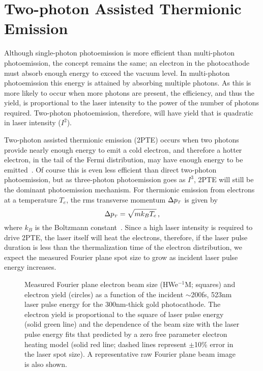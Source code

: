 
\section{Two-photon Assisted Thermionic Emission} \label{sec:two_photon_thermionic}

Although single-photon photoemission is more efficient than multi-photon photoemission, the concept remains the same; an electron in the photocathode must absorb enough energy to exceed the vacuum level.
In multi-photon photoemission this energy is attained by absorbing multiple photons.
As this is more likely to occur when more photons are present, the efficiency, and thus the yield, is proportional to the laser intensity to the power of the number of photons required.
Two-photon photoemission, therefore, will have yield that is quadratic in laser intensity ($I^2$).

Two-photon assisted thermionic emission (2PTE) occurs when two photons provide nearly enough energy to emit a cold electron, and therefore a hotter electron, in the tail of the Fermi distribution, may have enough energy to be emitted~\cite{yen_thermally_1980}.
Of course this is even less efficient than direct two-photon photoemission, but as three-photon photoemission goes as $I^3$, 2PTE will still be the dominant photoemission mechanism.
For thermionic emission from electrons at a temperature $T_e$, the rms transverse momentum $\Delta p_{{\scriptscriptstyle T}}$ is given by 
\begin{equation}
  \Delta p_{{\scriptscriptstyle T}} = \sqrt{m k_B T_e} \,\text{,}
\end{equation}
where $k_B$ is the Boltzmann constant~\cite{dowell_quantum_2009,jensen_emittance_2010}.
Since a high laser intensity is required to drive 2PTE, the laser itself will heat the electrons, therefore, if the laser pulse duration is less than the thermalization time of the electron distribution, %
we expect the measured Fourier plane spot size to grow as incident laser pulse energy increases.

\begin{figure}
  \centering
  
  \caption[Measured Fourier plane electron beam size and yield vs incident laser pulse energy on gold photocathode]{
    Measured Fourier plane electron beam size (HWe$^{-1}$M; squares) and electron yield (circles) as a function of the incident $\sim$200fs, 523nm laser pulse energy for the 300nm-thick gold photocathode.
    The electron yield is proportional to the square of laser pulse energy (solid green line) and the dependence of the beam size with the laser pulse energy fits that predicted by a zero free parameter electron heating model (solid red line; dashed lines represent $\pm$10\% error in the laser spot size).
    A representative raw Fourier plane beam image is also shown.
  }
  \label{fig:gold-emission}
\end{figure}

